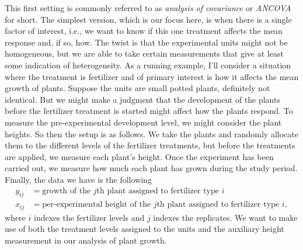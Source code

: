 \documentclass[a4paper, 12pt]{article}
\theoremstyle{plain}
\theoremstyle{definition}
\theoremstyle{remark}
\begin{document}
This first setting is commonly referred to as {\em analysis of covariance} or {\em ANCOVA} for short.  The simplest version, which is our focus here, is when there is a single factor of interest, i.e., we want to know if this one treatment affects the mean response and, if so, how.  The twist is that the experimental units might not be homogeneous, but we are able to take certain measurements that give at least some indication of heterogeneity.  As a running example, I'll consider a situation where the treatment is fertilizer and of primary interest is how it affects the mean growth of plants.  Suppose the units are small potted plants, definitely not identical.  But we might make a judgment that the development of the plants before the fertilizer treatment is started might affect how the plants respond.  To measure the pre-experimental development level, we might consider the plant heights.  So then the setup is as follows.  We take the plants and randomly allocate them to the different levels of the fertilizer treatments, but before the treatments are applied, we measure each plant's height.  Once the experiment has been carried out, we measure how much each plant has grown during the study period.  Finally, the data we have is the following 
\begin{align*}
y_{ij} & = \text{growth of the $j$th plant assigned to fertilizer type $i$} \\
x_{ij} & = \text{per-experimental height of the $j$th plant assigned to fertilizer type $i$},
\end{align*}
where $i$ indexes the fertilizer levels and $j$ indexes the replicates.  We want to make use of both the treatment levels assigned to the units and the auxiliary height measurement in our analysis of plant growth.  
\end{document}

